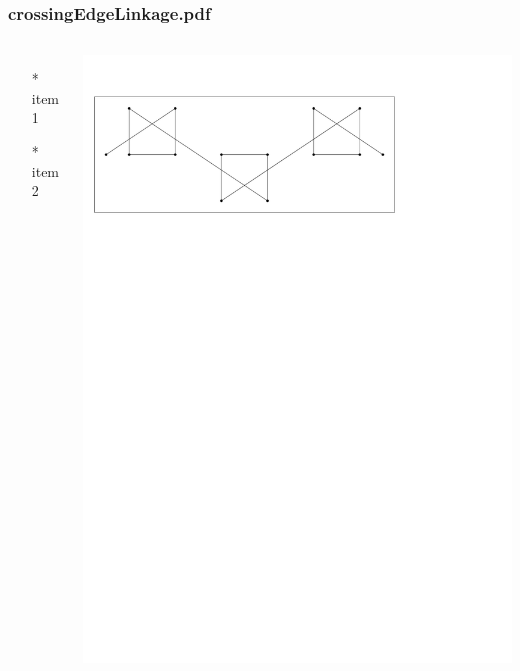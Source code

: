 \begin{frame} \frametitle{crossingEdgeLinkage.pdf}
    \begin{columns}[c]
        \begin{itemize}
            \item[*] item 1
            \item[*] item 2
        \end{itemize}
        \begin{minipage}{\linewidth}
            \begin{center}
            \includegraphics[width=.9\textwidth]{graphics/crossingEdgeLinkage.pdf}
            \label{gfx:crossingEdgeLinkage.pdf}
            \end{center}
        \end{minipage}
    \end{columns}
\end{frame}
